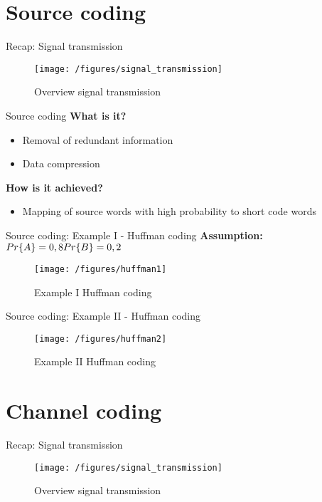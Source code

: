 \documentclass[ngerman]{beamer}
\begin{document}
\section{Source coding}
\begin{frame}{Recap: Signal transmission}
	\begin{figure}[htbp]
 	 	\centering 	
 		\texttt{[image: /figures/signal\_transmission]} 	 
 		\caption {Overview signal transmission \cite{friedrichs}}
	\end{figure}
\end{frame}

\begin{frame}{Source coding}
	\textbf{What is it?}
	\begin{itemize}[label={-}, itemsep=2ex]
		\item Removal of redundant information
		\item Data compression
	\end{itemize} 
	\textbf{How is it achieved?}
	\begin{itemize}[label={-}, itemsep=2ex]
		\item Mapping of source words with high probability to short code words
	\end{itemize} 
\end{frame}


\begin{frame}{Source coding: Example I - Huffman coding}
\textbf{Assumption:}\newline
$Pr\{A\} = 0,8 \newline Pr\{B\} = 0,2$
	\begin{figure}[htbp]
 	 	\centering 	
 		\texttt{[image: /figures/huffman1]} 	 
 		\caption {Example I Huffman coding \cite{huber}}
	\end{figure}
\end{frame}

\begin{frame}{Source coding: Example II - Huffman coding}
	\begin{figure}[htbp]
 	 	\centering 	
 		\texttt{[image: /figures/huffman2]} 	 
 		\caption {Example II Huffman coding \cite{huffman}}
	\end{figure}
\end{frame}


\section{Channel coding}
\begin{frame}{Recap: Signal transmission}
	\begin{figure}[htbp]
 	 	\centering 	
 		\texttt{[image: /figures/signal\_transmission]} 	 
 		\caption {Overview signal transmission \cite{friedrichs}}
	\end{figure}
\end{frame}
\end{document}
